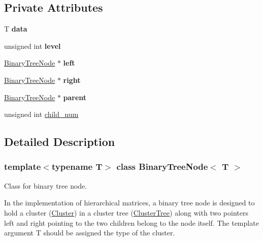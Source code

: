 \subsection*{Private Attributes}
\begin{DoxyCompactItemize}
\item 
\mbox{\label{classBinaryTreeNode_aefbcb5264485f5b637c3b25b370af450}} 
T {\bfseries data}
\item 
\mbox{\label{classBinaryTreeNode_af87f0bd6700c5d12815563da41e0b2f0}} 
unsigned int {\bfseries level}
\item 
\mbox{\label{classBinaryTreeNode_af3c06a27fffe0b35e83e1a7b717e042e}} 
\hyperlink{classBinaryTreeNode}{Binary\+Tree\+Node} $\ast$ {\bfseries left}
\item 
\mbox{\label{classBinaryTreeNode_acbe239a79828451cbdd38730995d9e89}} 
\hyperlink{classBinaryTreeNode}{Binary\+Tree\+Node} $\ast$ {\bfseries right}
\item 
\mbox{\label{classBinaryTreeNode_a55abb0ef30f3951450f3a22f030b6149}} 
\hyperlink{classBinaryTreeNode}{Binary\+Tree\+Node} $\ast$ {\bfseries parent}
\item 
unsigned int \hyperlink{classBinaryTreeNode_a434bfe00afd0b3dc86943e138f49fc3d}{child\+\_\+num}
\end{DoxyCompactItemize}


\subsection{Detailed Description}
\subsubsection*{template$<$typename T$>$\newline
class Binary\+Tree\+Node$<$ T $>$}

Class for binary tree node. 

In the implementation of hierarchical matrices, a binary tree node is designed to hold a cluster (\hyperlink{classCluster}{Cluster}) in a cluster tree (\hyperlink{classClusterTree}{Cluster\+Tree}) along with two pointers {\ttfamily left} and {\ttfamily right} pointing to the two children belong to the node itself. The template argument {\ttfamily T} should be assigned the type of the cluster. 

